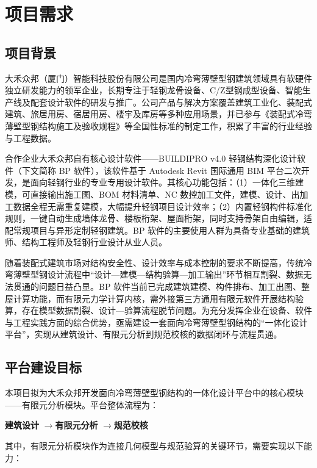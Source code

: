 \section{项目需求}

\subsection{项目背景}
大禾众邦（厦门）智能科技股份有限公司是国内冷弯薄壁型钢建筑领域具有软硬件独立研发能力的领军企业，长期专注于轻钢龙骨设备、C/Z型钢成型设备、智能生产线及配套设计软件的研发与推广。公司产品与解决方案覆盖建筑工业化、装配式建筑、旅居用房、宿居用房、楼宇及库房等多种应用场景，并已参与《装配式冷弯薄壁型钢结构施工及验收规程》等全国性标准的制定工作，积累了丰富的行业经验与工程数据。

合作企业大禾众邦自有核心设计软件——BUILDIPRO v4.0 轻钢结构深化设计软件（下文简称 BP 软件），该软件基于 Autodesk Revit 国际通用 BIM 平台二次开发，是面向轻钢行业的专业专用设计软件。其核心功能包括：（1）一体化三维建模，可直接输出施工图、BOM 材料清单、NC 数控加工文件，建模、设计、出加工数据全程无需重复建模，大幅提升轻钢项目设计效率；（2）内置轻钢构件标准化规则，一键自动生成墙体龙骨、楼板桁架、屋面桁架，同时支持骨架自由编辑，适配常规项目与异形定制轻钢建筑。BP 软件的主要使用人群为具备专业基础的建筑师、结构工程师及轻钢行业设计从业人员。

随着装配式建筑市场对结构安全性、设计效率与成本控制的要求不断提高，传统冷弯薄壁型钢设计流程中“设计—建模—结构验算—加工输出”环节相互割裂、数据无法贯通的问题日益凸显。BP 软件当前已完成建筑建模、构件排布、加工出图、整屋计算功能，而有限元力学计算内核，需外接第三方通用有限元软件开展结构验算，存在模型数据割裂、设计—验算流程脱节问题。为充分发挥企业在设备、软件与工程实践方面的综合优势，亟需建设一套面向冷弯薄壁型钢结构的“一体化设计平台”，实现从建筑设计、有限元分析到规范校核的数据闭环与流程贯通。

\subsection{平台建设目标}
本项目拟为大禾众邦开发面向冷弯薄壁型钢结构的一体化设计平台中的核心模块——有限元分析模块。平台整体流程为：

\begin{center}
\textbf{建筑设计} \quad$\longrightarrow$\quad \textbf{有限元分析} \quad$\longrightarrow$\quad \textbf{规范校核}
\end{center}

其中，有限元分析模块作为连接几何模型与规范验算的关键环节，需要实现以下能力：

